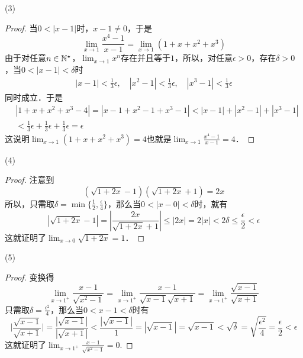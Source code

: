 (3)
\begin{proof}
当$0 < |x-1|$时，$x-1 \neq 0$，于是
\begin{equation}
    \lim_{x \to 1} \frac{x^4 - 1}{x-1} = \lim_{x \to 1} \left( 1 + x + x^2 + x^3 \right)
\end{equation}
由于对任意$n \in \mathbb{N}^\star$，$\displaystyle\lim_{x \to 1} x^n$存在并且等于$1$，所以，对任意$\epsilon > 0$，存在$\delta > 0$，当$0 < |x - 1| < \delta$时
\begin{align}
    |x-1|< \frac{1}{3}\epsilon, \quad |x^2-1|<\frac{1}{3}\epsilon, \quad |x^3-1|<\frac{1}{3}\epsilon
\end{align}
同时成立．于是
\begin{align}
    &|1+x+x^2+x^3-4| = |x - 1 + x^2 - 1 + x^3 - 1| < |x-1| + |x^2-1| + |x^3 - 1| \\
    &< \frac{1}{3}\epsilon + \frac{1}{3}\epsilon + \frac{1}{3}\epsilon = \epsilon
\end{align}
这说明$\displaystyle\lim_{x \to 1} \left(1 + x + x^2 + x^3\right) = 4$也就是$\displaystyle\lim_{x \to 1} \displaystyle\frac{x^4-1}{x-1} = 4$．
\end{proof}

(4)
\begin{proof}
注意到
\begin{equation}
    (\sqrt{1+2x} - 1)(\sqrt{1+2x} + 1) = 2x
\end{equation}
所以，只需取$\delta = \min \{ \displaystyle\frac{1}{2}, \frac{\epsilon}{4} \}$，那么当$0 < |x-0| < \delta$时，就有
\begin{equation}
    |\sqrt{1+2x} - 1| = |\frac{2x}{\sqrt{1+2x} + 1}| \leq |2x| = 2|x| < 2\delta \leq \frac{\epsilon}{2} < \epsilon
\end{equation}
这就证明了$\displaystyle\lim_{x \to 0} \sqrt{1+2x} = 1$．
\end{proof}

(5)
\begin{proof}
变换得
\begin{equation}
    \lim_{x \to 1^+} \frac{x-1}{\sqrt{x^2-1}} = \lim_{x \to 1^+} \frac{x-1}{\sqrt{x-1}\sqrt{x+1}} = \lim_{x \to 1^+} \frac{\sqrt{x-1}}{\sqrt{x+1}}
\end{equation}
只需取$\delta = \displaystyle\frac{\epsilon^2}{4}$，那么当$0 < x - 1 < \delta$时有
\begin{equation}
    \bigg\lvert \frac{\sqrt{x-1}}{\sqrt{x+1}} \bigg\rvert = \frac{|\sqrt{x-1}|}{|\sqrt{x+1}|} < \frac{|\sqrt{x-1}|}{1} = |\sqrt{x-1}| = \sqrt{x-1} < \sqrt{\delta} = \sqrt{\displaystyle\frac{\epsilon^2}{4}} = \frac{\epsilon}{2} < \epsilon
\end{equation}
这就证明了$\displaystyle\lim_{x \to 1^+} \displaystyle\frac{x-1}{\sqrt{x^2-1}} = 0$.
\end{proof}

